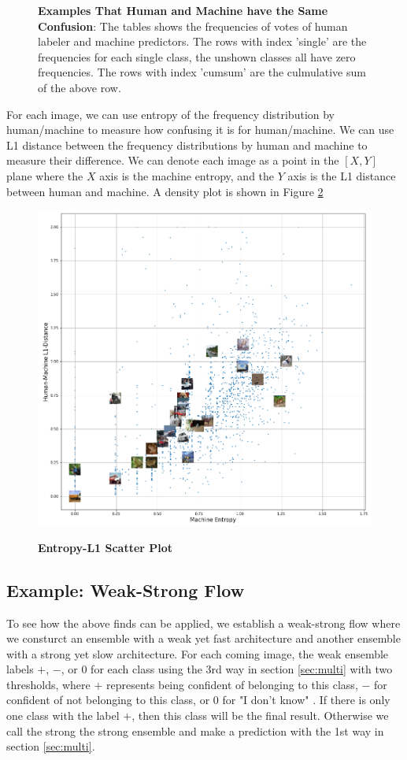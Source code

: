 \documentclass{article}
\begin{document}
\begin{figure}[H]
    \caption{\textbf{Examples That Human and Machine have the Same Confusion}: The tables shows the frequencies of votes of human labeler and machine predictors. The rows with index 'single' are the frequencies for each single class, the unshown classes all have zero frequencies. The rows with index 'cumsum' are the culmulative sum of the above row.}
    \label{fig:example_prob}
\end{figure}

For each image, we can use entropy of the frequency distribution by human/machine to measure how confusing it is for human/machine. We can use L1 distance between the frequency distributions by human and machine to measure their difference. We can denote each image as a point in the $\left[X,Y\right]$ plane where the $X$ axis is the machine entropy, and the $Y$ axis is the L1 distance between human and machine. A density plot is shown in Figure \ref{l1entropyscatter}

\begin{figure}[H]
    \centering
    \includegraphics[scale=0.5]{figs/l1_entropy_scatter.png}
    \label{l1entropyscatter}
    \caption{\textbf{Entropy-L1 Scatter Plot}}
\end{figure}


\subsection{Example: Weak-Strong Flow}
To see how the above finds can be applied, we establish a weak-strong flow where we consturct an ensemble with a weak yet fast architecture and another ensemble with a strong yet slow architecture. For each coming image, the weak ensemble labels $+$, $-$, or $0$ for each class using the 3rd way in section \ref{sec:multi} with two thresholds, where $+$ represents being confident of belonging to this class, $-$ for confident of not belonging to this class, or $0$ for "I don't know" . If there is only one class with the label $+$, then this class will be the final result. Otherwise we call the strong the strong ensemble and make a prediction with the 1st way in section \ref{sec:multi}. 
\end{document}
